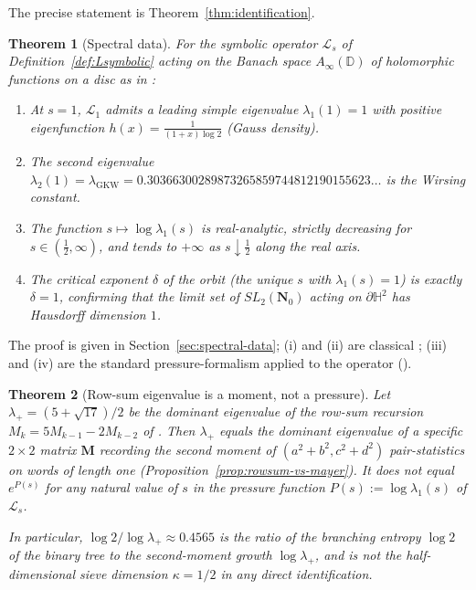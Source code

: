 ﻿\documentclass[11pt]{article}
\newtheorem{theorem}{Theorem}[section]
\theoremstyle{definition}
\newcommand{\Nz}{\mathbf{N}_0}
\newcommand{\SLNz}{SL_2(\Nz)}
\newcommand{\Lop}{\mathcal{L}}
\newcommand{\GKW}{\mathrm{GKW}}
\begin{document}
The precise statement is Theorem~\ref{thm:identification}.

\begin{theorem}[Spectral data]\label{thm:spectral-data}
For the symbolic operator $\Lop_s$ of Definition~\ref{def:Lsymbolic} acting on the Banach space $A_\infty(\mathbb{D})$ of holomorphic functions on a disc as in \cite{mayer}:
\begin{enumerate}
\item[(i)] At $s=1$, $\Lop_1$ admits a leading simple eigenvalue $\lambda_1(1)=1$ with positive eigenfunction $h(x)=\frac{1}{(1+x)\log 2}$ (Gauss density).
\item[(ii)] The second eigenvalue $\lambda_2(1)=\lambda_\GKW=0.30366300289873265859744812190155623\ldots$ is the Wirsing constant.
\item[(iii)] The function $s\mapsto\log\lambda_1(s)$ is real-analytic, strictly decreasing for $s\in(\tfrac12,\infty)$, and tends to $+\infty$ as $s\downarrow\tfrac12$ along the real axis.
\item[(iv)] The critical exponent $\delta$ of the orbit (the unique $s$ with $\lambda_1(s)=1$) is exactly $\delta=1$, confirming that the limit set of $\SLNz$ acting on $\partial\mathbb{H}^2$ has Hausdorff dimension $1$.
\end{enumerate}
\end{theorem}

The proof is given in Section~\ref{sec:spectral-data}; (i) and (ii) are classical \cite{wirsing,mayer-roepstorff}; (iii) and (iv) are the standard pressure-formalism applied to the operator (\cite{pollicott-vytnova,jenkinson-pollicott}).

\begin{theorem}[Row-sum eigenvalue is a moment, not a pressure]\label{thm:row-vs-pressure}
Let $\lambda_+=(5+\sqrt{17})/2$ be the dominant eigenvalue of the row-sum recursion $M_k=5M_{k-1}-2M_{k-2}$ of \cite[Theorem~4.4]{shakov2024}. Then $\lambda_+$ equals the dominant eigenvalue of a specific $2\times 2$ matrix $\mathbf{M}$ recording the second moment of $(a^2+b^2,c^2+d^2)$ pair-statistics on words of length one (Proposition~\ref{prop:rowsum-vs-mayer}). It does \emph{not} equal $e^{P(s)}$ for any natural value of $s$ in the pressure function $P(s):=\log\lambda_1(s)$ of $\Lop_s$.

In particular, $\log 2/\log\lambda_+ \approx 0.4565$ is the ratio of the branching entropy $\log 2$ of the binary tree to the second-moment growth $\log\lambda_+$, and is \emph{not} the half-dimensional sieve dimension $\kappa=1/2$ in any direct identification.
\end{theorem}
\end{document}
